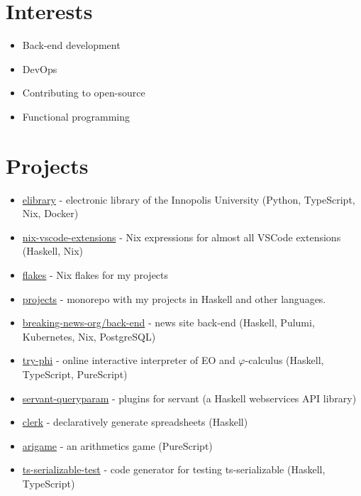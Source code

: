 \documentclass[twocolumn,11pt]{report}
\begin{document}
\section*{Interests}
\begin{itemize}
     \item Back-end development
     \item DevOps
     \item Contributing to open-source
     \item Functional programming
\end{itemize}

\section*{Projects}

\begin{itemize}
     \item \href{https://github.com/deemp/elibrary#readme}{elibrary} - electronic library of the Innopolis University (Python, TypeScript, Nix, Docker)
     \item \href{https://github.com/nix-community/nix-vscode-extensions#readme}{nix-vscode-extensions} - Nix expressions for almost all VSCode extensions (Haskell, Nix)
     \item \href{https://github.com/deemp/flakes#readme}{flakes} - Nix flakes for my projects
     \item \href{https://github.com/deemp/projects#readme}{projects} - monorepo with my projects in Haskell and other languages.
     \item \href{https://github.com/breaking-news-org/back-end#readme}{breaking-news-org/back-end} - news site back-end (Haskell, Pulumi, Kubernetes, Nix, PostgreSQL)
     \item \href{https://github.com/objectionary/try-phi#readme}{try-phi} - online interactive interpreter of EO and $\varphi$-calculus (Haskell, TypeScript, PureScript)
     \item \href{https://github.com/deemp/servant-queryparam#readme}{servant-queryparam} - plugins for servant (a Haskell webservices API library)
     \item \href{https://github.com/deemp/clerk#readme}{clerk} - declaratively generate spreadsheets (Haskell)
     \item \href{https://github.com/deemp/arigame#readme}{arigame} - an arithmetics game (PureScript)
     \item \href{https://github.com/deemp/projects/tree/main/haskell/ts-serializable-test#readme}{ts-serializable-test} - code generator for testing ts-serializable (Haskell, TypeScript)
\end{itemize}
\end{document}
